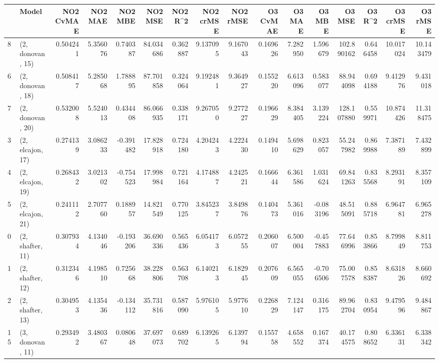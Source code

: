 \begin{tabular}{llrrrrrrrrrrrrrr}
\toprule
{} &             Model &  NO2 CvMAE &   NO2 MAE &   NO2 MBE &    NO2 MSE &   NO2 R\textasciicircum2 &  NO2 crMSE &  NO2 rMSE &  O3 CvMAE &    O3 MAE &    O3 MBE &      O3 MSE &    O3 R\textasciicircum2 &   O3 crMSE &    O3 rMSE \\
\midrule
8  &  (2, donovan, 15) &   0.504241 &  5.356076 &  0.740387 &  84.034686 &  0.362887 &   9.137095 &  9.167043 &  0.169626 &  7.282950 &  1.596679 &  102.890162 &  0.646458 &  10.017024 &  10.143479 \\
6  &  (2, donovan, 18) &   0.508417 &  5.285068 &  1.788895 &  87.701858 &  0.324064 &   9.192481 &  9.364927 &  0.155220 &  6.613096 &  0.583077 &   88.944098 &  0.694188 &   9.412976 &   9.431018 \\
7  &  (2, donovan, 20) &   0.532008 &  5.524013 &  0.434408 &  86.066935 &  0.338171 &   9.267050 &  9.277227 &  0.196629 &  8.384405 &  3.139224 &  128.107880 &  0.559971 &  10.874426 &  11.318475 \\
3  &  (2, elcajon, 17) &   0.274139 &  3.086233 & -0.391482 &  17.828918 &  0.724180 &   4.204243 &  4.222430 &  0.149410 &  5.698629 &  0.823057 &   55.247982 &  0.869988 &   7.387189 &   7.432899 \\
4  &  (2, elcajon, 19) &   0.268432 &  3.021302 & -0.754523 &  17.998984 &  0.721164 &   4.174887 &  4.242521 &  0.166644 &  6.361586 &  1.031624 &   69.841263 &  0.835568 &   8.293191 &   8.357109 \\
5  &  (2, elcajon, 21) &   0.241112 &  2.707760 &  0.188957 &  14.821549 &  0.770125 &   3.845237 &  3.849876 &  0.140473 &  5.361016 & -0.083196 &   48.515091 &  0.885718 &   6.964781 &   6.965278 \\
0  &  (2, shafter, 11) &   0.307934 &  4.134046 & -0.193206 &  36.690336 &  0.565436 &   6.054173 &  6.057255 &  0.206007 &  6.500004 & -0.457883 &   77.646996 &  0.853866 &   8.799849 &   8.811753 \\
1  &  (2, shafter, 12) &   0.312346 &  4.198510 &  0.725668 &  38.228806 &  0.563708 &   6.140213 &  6.182945 &  0.207609 &  6.565055 & -0.706506 &   75.007578 &  0.858387 &   8.631826 &   8.660692 \\
2  &  (2, shafter, 13) &   0.304953 &  4.135436 & -0.134112 &  35.731816 &  0.587090 &   5.976105 &  5.977610 &  0.226829 &  7.124147 &  0.316175 &   89.962704 &  0.830954 &   9.479596 &   9.484867 \\
15 &  (3, donovan, 11) &   0.293492 &  3.480367 &  0.080648 &  37.697073 &  0.689702 &   6.139265 &  6.139794 &  0.155758 &  4.658552 &  0.167374 &   40.174575 &  0.808652 &   6.336131 &   6.338342 \\

\end{tabular}
